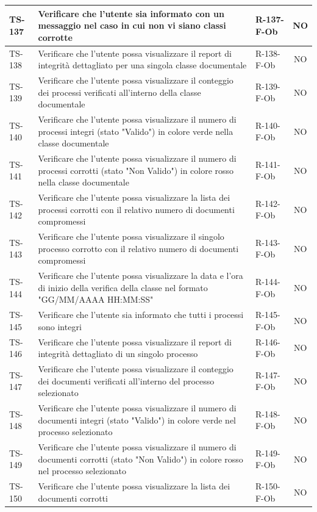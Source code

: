 \documentclass[a4paper,12pt]{article}
\begin{document}
\begin{longtable}{|p{1.5cm}|p{8.3cm}|p{2.4cm}|c|}
\hline
TS-137 & Verificare che l'utente sia informato con un messaggio nel caso in cui non vi siano classi corrotte & R-137-F-Ob & NO \\
\hline
TS-138 & Verificare che l'utente possa visualizzare il report di integrità dettagliato per una singola classe documentale & R-138-F-Ob & NO \\
\hline
TS-139 & Verificare che l'utente possa visualizzare il conteggio dei processi verificati all'interno della classe documentale & R-139-F-Ob & NO \\
\hline
TS-140 & Verificare che l'utente possa visualizzare il numero di processi integri (stato "Valido") in colore verde nella classe documentale & R-140-F-Ob & NO \\
\hline
TS-141 & Verificare che l'utente possa visualizzare il numero di processi corrotti (stato "Non Valido") in colore rosso nella classe documentale & R-141-F-Ob & NO \\
\hline
TS-142 & Verificare che l'utente possa visualizzare la lista dei processi corrotti con il relativo numero di documenti compromessi & R-142-F-Ob & NO \\
\hline
TS-143 & Verificare che l'utente possa visualizzare il singolo processo corrotto con il relativo numero di documenti compromessi & R-143-F-Ob & NO \\
\hline
TS-144 & Verificare che l'utente possa visualizzare la data e l'ora di inizio della verifica della classe nel formato "GG/MM/AAAA HH:MM:SS" & R-144-F-Ob & NO \\
\hline
TS-145 & Verificare che l'utente sia informato che tutti i processi sono integri & R-145-F-Ob & NO \\
\hline
TS-146 & Verificare che l'utente possa visualizzare il report di integrità dettagliato di un singolo processo & R-146-F-Ob & NO \\
\hline
TS-147 & Verificare che l'utente possa visualizzare il conteggio dei documenti verificati all'interno del processo selezionato & R-147-F-Ob & NO \\
\hline
TS-148 & Verificare che l'utente possa visualizzare il numero di documenti integri (stato "Valido") in colore verde nel processo selezionato & R-148-F-Ob & NO \\
\hline
TS-149 & Verificare che l'utente possa visualizzare il numero di documenti corrotti (stato "Non Valido") in colore rosso nel processo selezionato & R-149-F-Ob & NO \\
\hline
TS-150 & Verificare che l'utente possa visualizzare la lista dei documenti corrotti & R-150-F-Ob & NO \\

\end{longtable}
\end{document}

